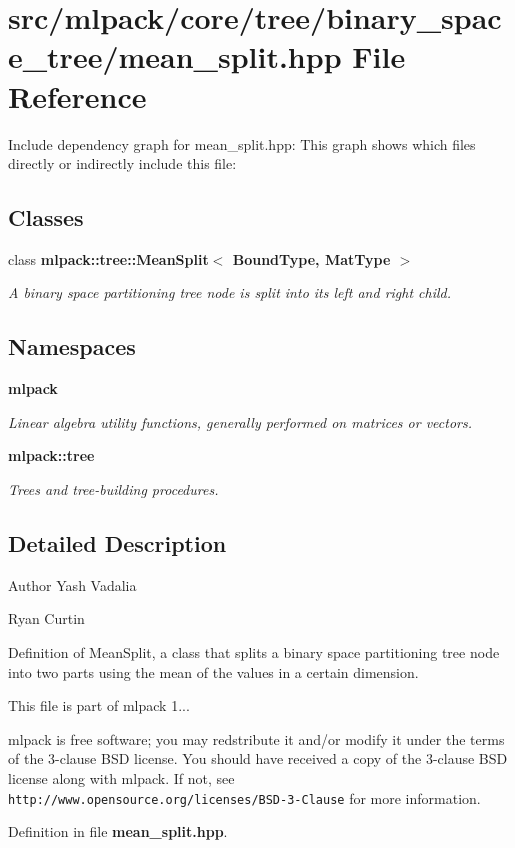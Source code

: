 \section{src/mlpack/core/tree/binary\-\_\-space\-\_\-tree/mean\-\_\-split.hpp File Reference}
\label{mean__split_8hpp}
Include dependency graph for mean\-\_\-split.\-hpp\-:
This graph shows which files directly or indirectly include this file\-:
\subsection*{Classes}
\begin{DoxyCompactItemize}
\item 
class {\bf mlpack\-::tree\-::\-Mean\-Split$<$ Bound\-Type, Mat\-Type $>$}
\begin{DoxyCompactList}\small\item\em A binary space partitioning tree node is split into its left and right child. \end{DoxyCompactList}\end{DoxyCompactItemize}
\subsection*{Namespaces}
\begin{DoxyCompactItemize}
\item 
{\bf mlpack}
\begin{DoxyCompactList}\small\item\em Linear algebra utility functions, generally performed on matrices or vectors. \end{DoxyCompactList}\item 
{\bf mlpack\-::tree}
\begin{DoxyCompactList}\small\item\em Trees and tree-\/building procedures. \end{DoxyCompactList}\end{DoxyCompactItemize}


\subsection{Detailed Description}
\begin{DoxyAuthor}{Author}
Yash Vadalia 

Ryan Curtin
\end{DoxyAuthor}
Definition of Mean\-Split, a class that splits a binary space partitioning tree node into two parts using the mean of the values in a certain dimension.

This file is part of mlpack 1...

mlpack is free software; you may redstribute it and/or modify it under the terms of the 3-\/clause B\-S\-D license. You should have received a copy of the 3-\/clause B\-S\-D license along with mlpack. If not, see {\tt http\-://www.\-opensource.\-org/licenses/\-B\-S\-D-\/3-\/\-Clause} for more information. 

Definition in file {\bf mean\-\_\-split.\-hpp}.

